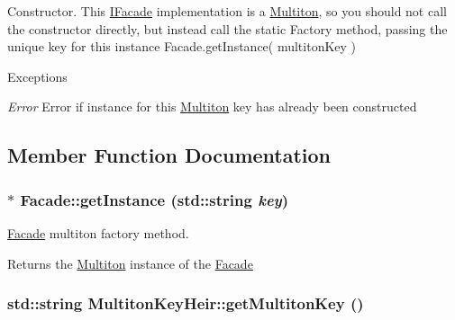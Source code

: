 Constructor. This {\ttfamily \hyperlink{class_pure_m_v_c_1_1_i_facade}{IFacade}} implementation is a \hyperlink{class_pure_m_v_c_1_1_multiton}{Multiton}, so you should not call the constructor directly, but instead call the static Factory method, passing the unique key for this instance {\ttfamily Facade.getInstance( multitonKey )}


\begin{DoxyExceptions}{Exceptions}
\item[{\em Error}]Error if instance for this \hyperlink{class_pure_m_v_c_1_1_multiton}{Multiton} key has already been constructed \end{DoxyExceptions}


\subsection{Member Function Documentation}
\hypertarget{class_pure_m_v_c_1_1_facade_ae1c830f15ab4362829848514f5a16cca}{
\subsubsection[{getInstance}]{ $\ast$ Facade::getInstance (std::string {\em key})}}
\label{class_pure_m_v_c_1_1_facade_ae1c830f15ab4362829848514f5a16cca}


{\ttfamily \hyperlink{class_pure_m_v_c_1_1_facade}{Facade}} multiton factory method. \begin{DoxyReturn}{Returns}
the \hyperlink{class_pure_m_v_c_1_1_multiton}{Multiton} instance of the \hyperlink{class_pure_m_v_c_1_1_facade}{Facade} 
\end{DoxyReturn}
\hypertarget{class_pure_m_v_c_1_1_multiton_key_heir_aa5622459d33380deb08dc3cab8b991c7}{
\subsubsection[{getMultitonKey}]{\setlength{\rightskip}{0pt plus 5cm}std::string MultitonKeyHeir::getMultitonKey ()}}
\label{class_pure_m_v_c_1_1_multiton_key_heir_aa5622459d33380deb08dc3cab8b991c7}


